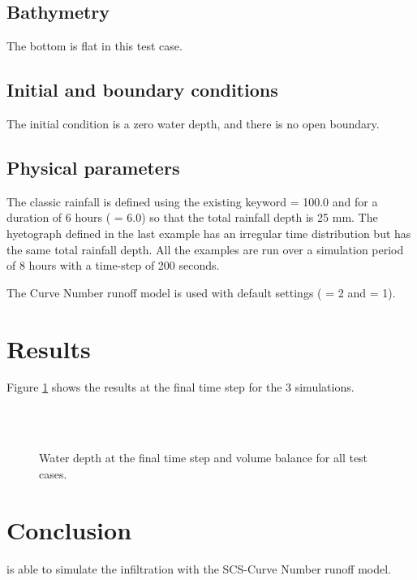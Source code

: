 \subsection{Bathymetry}

The bottom is flat in this test case.

\subsection{Initial and boundary conditions}

The initial condition is a zero water depth, and there is no open boundary.

\subsection{Physical parameters}

The classic rainfall is defined using the existing keyword  = 100.0 and for a duration of 6 hours ( = 6.0) so that the total rainfall depth is 25 mm. The hyetograph defined in the last example has an irregular time distribution but has the same total rainfall depth. All the examples are run over a simulation period of 8 hours with a time-step of 200 seconds.

The Curve Number runoff model is used with default settings ( = 2 and  = 1).

\section{Results}

Figure \ref{pluie:fig:res} shows the results at the final time step for the 3 simulations.

\begin{figure}[!htbp]
 \centering
 \\
 \\
 \caption{Water depth at the final time step and volume balance for all test cases.}
 \label{pluie:fig:res}
\end{figure}

\section{Conclusion}

 is able to simulate the infiltration with the SCS-Curve Number runoff model.
